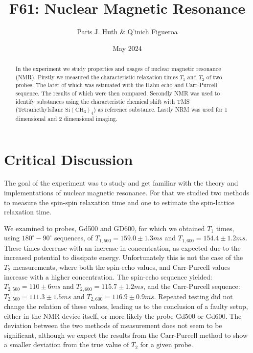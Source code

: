 \documentclass[11 pt]{article}
\title{F61: Nuclear Magnetic Resonance}
\author{Paris J. Huth \& Q'inich Figueroa}
\date{May 2024}
\begin{document}
\maketitle
\begin{center}
\begin{abstract}
In the experiment we study properties and usages of nuclear magnetic resonance (NMR). Firstly we measured the characteristic relaxation times $T_1$ and $T_2$ of two probes. The later of which was estimated with the Hahn echo and Carr-Purcell sequence. The results of which were then compared. Secondly NMR was used to identify substances using  the characteristic chemical shift with TMS (Tetramethylsilane $\mathrm{Si}\left(\mathrm{CH_3}\right)_4$) as reference substance. Lastly NRM was used for 1 dimensional and 2 dimensional imaging.  
\end{abstract}
\end{center}




\newpage
\section{Critical Discussion}
The goal of the experiment was to study and get familiar with the theory and implementations of nuclear magnetic resonance. For that we studied two methods to measure the spin-spin relaxation time and one to estimate the spin-lattice relaxation time.

We examined to probes, Gd500 and GD600, for which we obtained $T_1$ times, using $180^\circ - 90^\circ$ sequences, of $T_{1,500}=159.0\pm 1.3 ms$ and $T_{1,600}=154.4\pm 1.2 ms$. These times decrease with an increase in concentration, as expected due to the increased potential to dissipate energy.
Unfortunately this is not the case of the $T_2$ measurements, where both the spin-echo values, and Carr-Purcell values increase with a higher concentration. The spin-echo sequence yielded: $T_{2,500}=110\pm 6 ms$ and $T_{2,600}=115.7\pm 1.2 ms$, and the Carr-Purcell sequence: $T_{2,500}=111.3\pm 1.5 ms$ and $T_{2,600}=116.9\pm 0.9 ms$. Repeated testing did not change the relation of these values, leading us to the conclusion of a faulty setup, either in the NMR device itself, or more likely the probe Gd500 or Gd600. 
The deviation between the two methods of measurement does not seem to be significant, although we expect the results from the Carr-Purcell method to show a smaller deviation from the true value of $T_2$ for a given probe.
\end{document}
